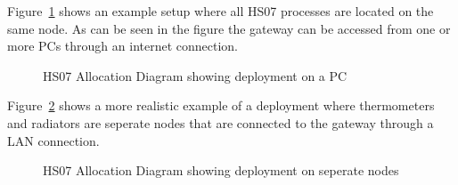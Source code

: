 \documentclass[a4paper,10pt]{article}
\begin{document}
Figure~\ref{fig:allocation_pc} shows an example setup
where all HS07 processes are located on the same node. As can be seen in the
figure the gateway can be accessed from one or more PCs through an internet
connection.

\clearpage

\begin{figure}[!htb]
\caption{HS07 Allocation Diagram showing deployment on a PC}
\label{fig:allocation_pc}
\end{figure}

Figure~\ref{fig:allocation_actual} shows a more realistic example of a deployment
where thermometers and radiators are seperate nodes that are connected to
the gateway through a LAN connection.

\begin{figure}[!htb]
\caption{HS07 Allocation Diagram showing deployment on seperate nodes}
\label{fig:allocation_actual}
\end{figure}


\end{document}
